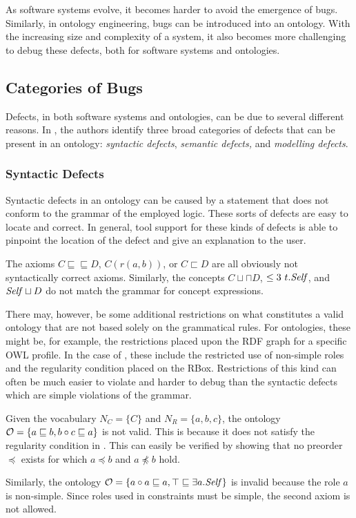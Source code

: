 
As software systems evolve, it becomes harder to avoid the emergence of bugs. Similarly, in ontology engineering, bugs can be introduced into an ontology. With the increasing size and complexity of a system, it also becomes more challenging to debug these defects, both for software systems and ontologies.

\subsection{Categories of Bugs} \label{categories-of-bugs}

Defects, in both software systems and ontologies, can be due to several different reasons. In \cite{kalyanpur2005debugging}, the authors identify three broad categories of defects that can be present in an ontology: \emph{syntactic defects}, \emph{semantic defects,} and \emph{modelling defects}.

\subsubsection{Syntactic Defects} \label{syntactic-defects}

Syntactic defects in an ontology can be caused by a statement that does not conform to the grammar of the employed logic. These sorts of defects are easy to locate and correct. In general, tool support for these kinds of defects is able to pinpoint the location of the defect and give an explanation to the user.

\begin{example}
  The axioms $C \sqsubseteq \sqsubseteq D$, $C(r(a, b))$, or $C \sqsubset D$ are all obviously not syntactically correct \SROIQ axioms. Similarly, the concepts $C \sqcup \sqcap D$, $\leq 3~t.\mathit{Self}$, and $\mathit{Self} \sqcup D$ do not match the grammar for concept expressions.
\end{example}

There may, however, be some additional restrictions on what constitutes a valid ontology that are not based solely on the grammatical rules. For ontologies, these might be, for example, the restrictions placed upon the RDF graph for a specific OWL profile. In the case of \SROIQ, these include the restricted use of non-simple roles and the regularity condition placed on the RBox. Restrictions of this kind can often be much easier to violate and harder to debug than the syntactic defects which are simple violations of the grammar.

\begin{example}
  Given the vocabulary $N_C = \{ C \}$ and $N_R = \{ a, b, c \}$, the \SROIQ ontology $\mathcal{O} = \{ a \sqsubseteq b, b \circ c \sqsubseteq a \}$ is not valid. This is because it does not satisfy the regularity condition in \SROIQ. This can easily be verified by showing that no preorder $\preceq$ exists for which $a \preceq b$ and $a \not\preceq b$ hold.

  Similarly, the ontology $\mathcal{O} = \{ a \circ a \sqsubseteq a, \top \sqsubseteq \exists a.\mathit{Self} \}$ is invalid because the role $a$ is non-simple. Since roles used in \self constraints must be simple, the second axiom is not allowed.
\end{example}

